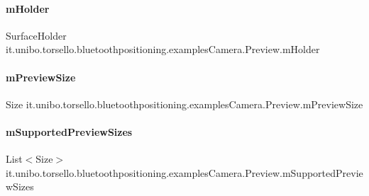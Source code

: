 \paragraph{\texorpdfstring{m\+Holder}{mHolder}}
{\footnotesize\ttfamily Surface\+Holder it.\+unibo.\+torsello.\+bluetoothpositioning.\+examples\+Camera.\+Preview.\+m\+Holder\hspace{0.3cm}{\ttfamily [package]}}

\hypertarget{classit_1_1unibo_1_1torsello_1_1bluetoothpositioning_1_1examplesCamera_1_1Preview_a88377f3f6e83780ee72b8cd7af58f139_a88377f3f6e83780ee72b8cd7af58f139}{}\label{classit_1_1unibo_1_1torsello_1_1bluetoothpositioning_1_1examplesCamera_1_1Preview_a88377f3f6e83780ee72b8cd7af58f139_a88377f3f6e83780ee72b8cd7af58f139} 
\paragraph{\texorpdfstring{m\+Preview\+Size}{mPreviewSize}}
{\footnotesize\ttfamily Size it.\+unibo.\+torsello.\+bluetoothpositioning.\+examples\+Camera.\+Preview.\+m\+Preview\+Size\hspace{0.3cm}{\ttfamily [package]}}

\hypertarget{classit_1_1unibo_1_1torsello_1_1bluetoothpositioning_1_1examplesCamera_1_1Preview_a791c85132a70dbfdf70587f12753e306_a791c85132a70dbfdf70587f12753e306}{}\label{classit_1_1unibo_1_1torsello_1_1bluetoothpositioning_1_1examplesCamera_1_1Preview_a791c85132a70dbfdf70587f12753e306_a791c85132a70dbfdf70587f12753e306} 
\paragraph{\texorpdfstring{m\+Supported\+Preview\+Sizes}{mSupportedPreviewSizes}}
{\footnotesize\ttfamily List$<$Size$>$ it.\+unibo.\+torsello.\+bluetoothpositioning.\+examples\+Camera.\+Preview.\+m\+Supported\+Preview\+Sizes\hspace{0.3cm}{\ttfamily [package]}}


